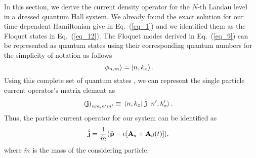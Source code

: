 In this section, we derive the current density operator for the $N$-th Landau level in a dressed quantum Hall system. We already found the exact solution for our time-dependent Hamiltonian give in Eq.~(\ref{eq_1}) and we identified them as the Floquet states in Eq.~(\ref{eq_12}). The Floquet modes derived in Eq.~(\ref{eq_9}) can be represented as quantum states using their corresponding quantum numbers for the simplicity of notation as follows
\begin{equation} \label{eq_d1}
  \ket{\phi_{n,m}} = \ket{n,k_x}.
\end{equation}
Using this complete set of quantum states \cite{wackerl20,holthaus15,grifoni98}, we can represent the single particle current operator's matrix element as
\begin{equation} \label{eq_d2}
  \qty(\vb{j})_{nm,n'm'} \equiv \mel{n,k_x}{\;\hat{\vb{j}}\;}{n',k'_x}.
\end{equation}
Thus, the particle current operator for our system \cite{mahan00,bruus04} can be identified as
\begin{equation} \label{eq_d3}
  \hat{\vb{j}} = \frac{1}{\widetilde{m}} \qty(\hat{\vb{p}} - e\qty[\vb{A}_s + \vb{A}_d(t)]),
\end{equation}
where $\widetilde{m}$ is the mass of the considering particle.

